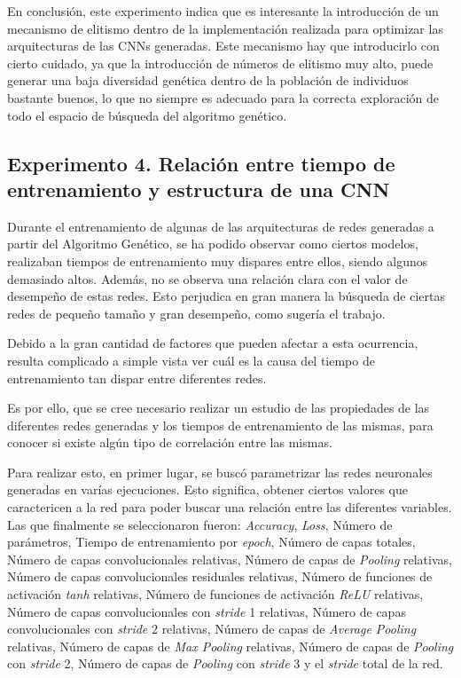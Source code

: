 En conclusión, este experimento indica que es interesante la introducción de un mecanismo de elitismo dentro de la implementación realizada para optimizar las arquitecturas de las CNNs generadas. Este mecanismo hay que introducirlo con cierto cuidado, ya que la introducción de números de elitismo muy alto, puede generar una baja diversidad genética dentro de la población de individuos bastante buenos, lo que no siempre es adecuado para la correcta exploración de todo el espacio de búsqueda del algoritmo genético.


\subsection{Experimento 4. Relación entre tiempo de entrenamiento y estructura de una CNN}

Durante el entrenamiento de algunas de las arquitecturas de redes generadas a partir del Algoritmo Genético, se ha podido observar como ciertos modelos, realizaban tiempos de entrenamiento muy dispares entre ellos, siendo algunos demasiado altos. Además, no se observa una relación clara con el valor de desempeño de estas redes. Esto perjudica en gran manera la búsqueda de ciertas redes de pequeño tamaño y gran desempeño, como sugería el trabajo.

Debido a la gran cantidad de factores que pueden afectar a esta ocurrencia, resulta complicado a simple vista ver cuál es la causa del tiempo de entrenamiento tan dispar entre diferentes redes. 

Es por ello, que se cree necesario realizar un estudio de las propiedades de las diferentes redes generadas y los tiempos de entrenamiento de las mismas, para conocer si existe algún tipo de correlación entre las mismas.

Para realizar esto, en primer lugar, se buscó parametrizar las redes neuronales generadas en varías ejecuciones. Esto significa, obtener ciertos valores que caractericen a la red para poder buscar una relación entre las diferentes variables. Las que finalmente se seleccionaron fueron: \textit{Accuracy}, \textit{Loss}, Número de parámetros, Tiempo de entrenamiento por \textit{epoch}, Número de capas totales, Número de capas convolucionales relativas, Número de capas de \textit{Pooling} relativas, Número de capas convolucionales residuales relativas, Número de funciones de activación \textit{tanh} relativas, Número de funciones de activación \textit{ReLU} relativas, Número de capas convolucionales con \textit{stride} 1 relativas, Número de capas convolucionales con \textit{stride} 2 relativas, Número de capas de \textit{Average Pooling} relativas, Número de capas de \textit{Max Pooling} relativas, Número de capas de \textit{Pooling} con \textit{stride} 2, Número de capas de \textit{Pooling} con \textit{stride} 3 y el \textit{stride} total de la red.

